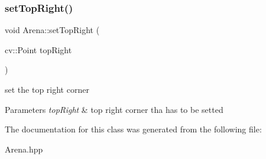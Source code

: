 \subsubsection{\texorpdfstring{set\+Top\+Right()}{setTopRight()}}
{\footnotesize\ttfamily void Arena\+::set\+Top\+Right (\begin{DoxyParamCaption}\item[{cv\+::\+Point}]{top\+Right }\end{DoxyParamCaption})}

set the top right corner 
\begin{DoxyParams}{Parameters}
{\em top\+Right} & top right corner tha has to be setted \\
\hline
\end{DoxyParams}


The documentation for this class was generated from the following file\+:\begin{DoxyCompactItemize}
\item 
Arena.\+hpp\end{DoxyCompactItemize}
